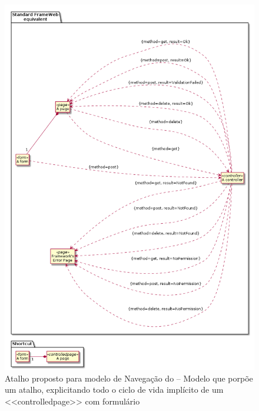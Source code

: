 \begin{figure}[H]
	\centering
	\includegraphics[scale=0.5]{figuras/navigation-shortcut1_4.png}
	\caption{Atalho proposto para modelo de Navegação do \imprimirtitulo{} -- Modelo que porpõe um atalho, explicitando todo o ciclo de vida implícito de um <<controlledpage>> com formulário}
	\label{fig:shortcut1:3}
\end{figure}

